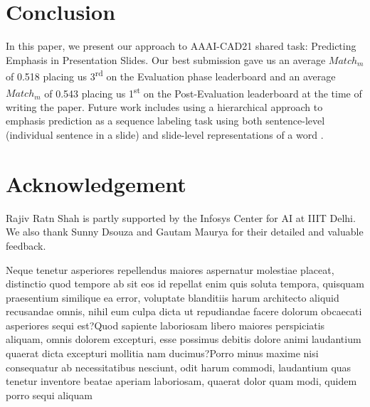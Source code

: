 \documentclass[letterpaper]{article} %
\begin{document}
\vspace{-1.69mm}
\section{Conclusion}
In this paper, we present our approach to  AAAI-CAD21 shared task: Predicting Emphasis in Presentation Slides. Our best submission gave us an average $Match_m$ of 0.518 placing us 3\textsuperscript{\rm rd} on the Evaluation phase leaderboard and an average $Match_m$ of 0.543 placing us 1\textsuperscript{\rm st} on the Post-Evaluation leaderboard at the time of writing the paper. Future work includes using a hierarchical approach to emphasis prediction as a sequence labeling task using both sentence-level (individual sentence in a slide) and slide-level representations of a word \citep{luo2019hierarchical}.

\section{Acknowledgement}
Rajiv Ratn Shah is partly supported by the Infosys Center for AI at IIIT Delhi. We also thank Sunny Dsouza and Gautam Maurya for their detailed and valuable feedback.



Neque tenetur asperiores repellendus maiores aspernatur molestiae placeat, distinctio quod tempore ab sit eos id repellat enim quis soluta tempora, quisquam praesentium similique ea error, voluptate blanditiis harum architecto aliquid recusandae omnis, nihil eum culpa dicta ut repudiandae facere dolorum obcaecati asperiores sequi est?Quod sapiente laboriosam libero maiores perspiciatis aliquam, omnis dolorem excepturi, esse possimus debitis dolore animi laudantium quaerat dicta excepturi mollitia nam ducimus?Porro minus maxime nisi consequatur ab necessitatibus nesciunt, odit harum commodi, laudantium quas tenetur inventore beatae aperiam laboriosam, quaerat dolor quam modi, quidem porro sequi aliquam

\end{document}
